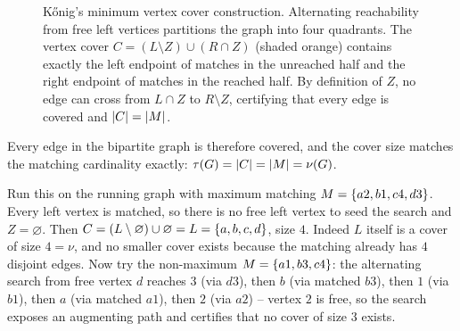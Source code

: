 \begin{figure}[H]
\caption{K\H{o}nig's minimum vertex cover construction. Alternating reachability from free left vertices partitions the graph into four quadrants. The vertex cover $C=(L\setminus Z)\cup(R\cap Z)$ (shaded orange) contains exactly the left endpoint of matches in the unreached half and the right endpoint of matches in the reached half. By definition of $Z$, no edge can cross from $L\cap Z$ to $R\setminus Z$, certifying that every edge is covered and $\lvert C\rvert=\lvert M\rvert$.}
\label{ch15:fig-konig-cover}
\end{figure}

Every edge in the bipartite graph is therefore covered, and the cover size matches the matching cardinality exactly: $\tau(G) = \lvert C\rvert = \lvert M\rvert = \nu(G)$.

\begin{labbox}
Run this on the running graph with maximum matching $M=\{a2,b1,c4,d3\}$. Every
left vertex is matched, so there is no free left vertex to seed the search and
$Z=\varnothing$. Then $C=(L\setminus\varnothing)\cup\varnothing = L=\{a,b,c,d\}$,
size $4$. Indeed $L$ itself is a cover of size $4=\nu$, and no smaller cover
exists because the matching already has $4$ disjoint edges. Now try the
non-maximum $M=\{a1,b3,c4\}$: the alternating search from free vertex $d$
reaches $3$ (via $d3$), then $b$ (via matched $b3$), then $1$ (via $b1$), then
$a$ (via matched $a1$), then $2$ (via $a2$) -- vertex $2$ is free, so the search
exposes an augmenting path and certifies that no cover of size $3$ exists.
\end{labbox}

